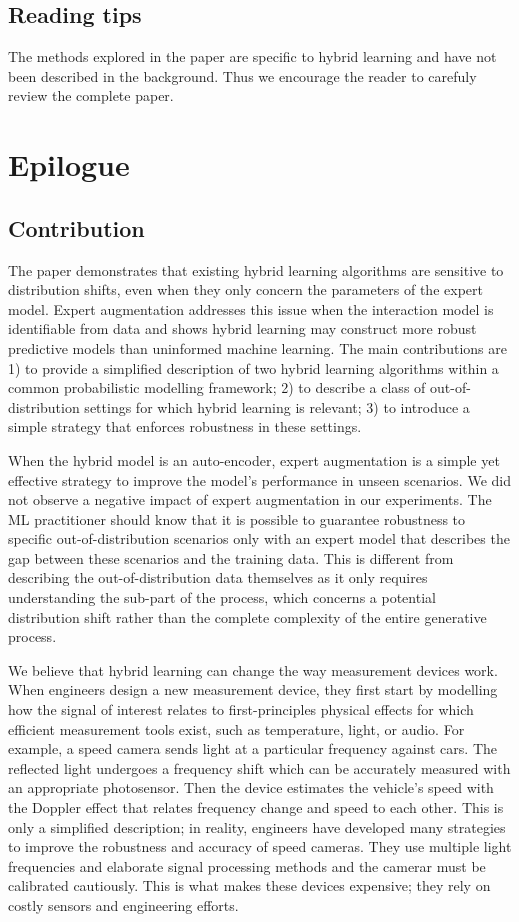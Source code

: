 \subsection{Reading tips}
The methods explored in the paper are specific to hybrid learning and have not been described in the background. Thus we encourage the reader to carefuly review the complete paper.



\section{Epilogue}
\subsection{Contribution}
The paper demonstrates that existing hybrid learning algorithms are sensitive to distribution shifts, even when they only concern the parameters of the expert model. Expert augmentation addresses this issue when the interaction model is identifiable from data and shows hybrid learning may construct more robust predictive models than uninformed machine learning. The main contributions are 1) to provide a simplified description of two hybrid learning algorithms within a common probabilistic modelling framework; 2) to describe a class of out-of-distribution settings for which hybrid learning is relevant; 3) to introduce a simple strategy that enforces robustness in these settings.

When the hybrid model is an auto-encoder, expert augmentation is a simple yet effective strategy to improve the model's performance in unseen scenarios. We did not observe a negative impact of expert augmentation in our experiments. The ML practitioner should know that it is possible to guarantee robustness to specific out-of-distribution scenarios only with an expert model that describes the gap between these scenarios and the training data. This is different from describing the out-of-distribution data themselves as it only requires understanding the sub-part of the process, which concerns a potential distribution shift rather than the complete complexity of the entire generative process.

We believe that hybrid learning can change the way measurement devices work. When engineers design a new measurement device, they first start by modelling how the signal of interest relates to first-principles physical effects for which efficient measurement tools exist, such as temperature, light, or audio. For example, a speed camera sends light at a particular frequency against cars. The reflected light undergoes a frequency shift which can be accurately measured with an appropriate photosensor. Then the device estimates the vehicle's speed with the Doppler effect that relates frequency change and speed to each other. This is only a simplified description; in reality, engineers have developed many strategies to improve the robustness and accuracy of speed cameras. They use multiple light frequencies and elaborate signal processing methods and the camerar must be calibrated cautiously. This is what makes these devices expensive; they rely on costly sensors and engineering efforts.

